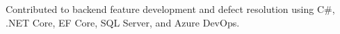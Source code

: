 \vspace{1.0mm}
\resumeItemListStart
    \item{Contributed to backend feature development and defect resolution using C\#, .NET Core, EF Core, SQL Server, and Azure DevOps.}
\resumeItemListEnd
